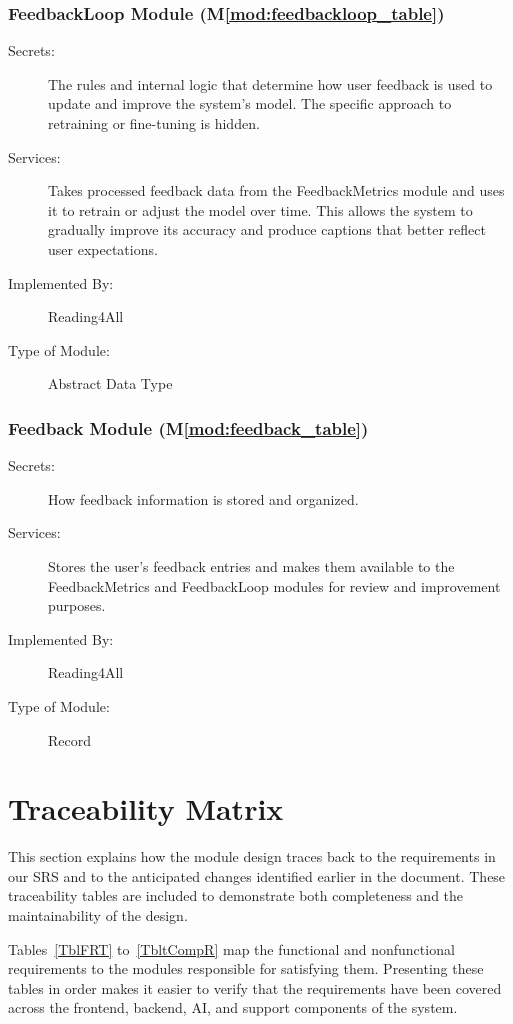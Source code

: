 \documentclass[12pt, titlepage]{article}
\newcommand{\mref}[1]{M\ref{#1}}
\begin{document}
\subsubsection{FeedbackLoop Module (\mref{mod:feedbackloop_table})}
\label{mod:feedbackloop}
\begin{description}
  \item[Secrets:] The rules and internal logic that determine how
    user feedback is used to update and improve the system’s model.
    The specific approach to retraining or fine-tuning is hidden.
  \item[Services:] Takes processed feedback data from the
    FeedbackMetrics module and uses it to retrain or adjust the model
    over time. This allows the system to gradually improve its
    accuracy and produce captions that better reflect user expectations.
  \item[Implemented By:] Reading4All
  \item[Type of Module:] Abstract Data Type
\end{description}

\subsubsection{Feedback Module (\mref{mod:feedback_table})}
\label{mod:feedback}
\begin{description}
  \item[Secrets:] How feedback information is stored and organized.
  \item[Services:] Stores the user’s feedback entries and makes them
    available to the FeedbackMetrics and FeedbackLoop modules for
    review and improvement purposes.
  \item[Implemented By:] Reading4All
  \item[Type of Module:] Record
\end{description}

\section{Traceability Matrix} \label{SecTM}

This section explains how the module design traces back to the requirements in
our SRS and to the anticipated changes identified earlier in the document.
These traceability tables are included to demonstrate both completeness and the
maintainability of the design.

Tables~\ref{TblFRT} to~\ref{TbltCompR} map the functional and nonfunctional
requirements to the modules responsible for satisfying them. Presenting these
tables in order makes it easier to verify that the requirements have been
covered across the frontend, backend, AI, and support components of the
system.
\end{document}
